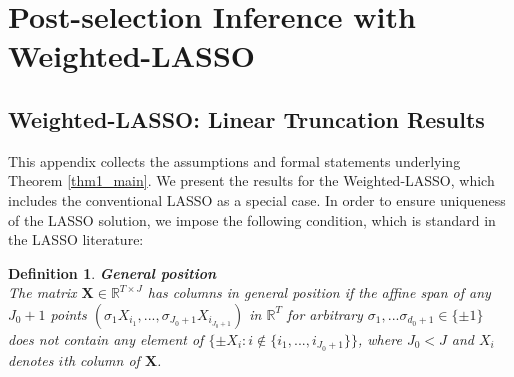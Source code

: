 \documentclass[11pt]{article}
\newcommand{\RR}{\mathbb{R}}
\begin{document}

\appendix


\renewcommand{\thesubsection}{\Alph{section}.\arabic{subsection}}
\setcounter{table}{0}
\setcounter{figure}{0}
\renewcommand{\thetable}{A.\arabic{table}}
\renewcommand{\thefigure}{A.\arabic{figure}}


\newtheorem{thm}{Theorem}[section]
\newtheorem{lem}{Theorem}[section]
\newtheorem{defin}{Theorem}[section]
\newtheorem{ass}{Theorem}[section]


\newtheorem{theorem_app}[thm]{Theorem}
\newtheorem{lemma_app}[lem]{Lemma}
\newtheorem{assumption_app}[ass]{Assumption}
\newtheorem{def_app}[defin]{Definition}



\section{Post-selection Inference with Weighted-LASSO}\label{lab:appendix}

\subsection{Weighted-LASSO: Linear Truncation Results}\label{lab:appendixA1}

This appendix collects the assumptions and formal statements underlying Theorem \ref{thm1_main}. We present the results for the Weighted-LASSO, which includes the conventional LASSO as a special case. In order to ensure uniqueness of the LASSO solution, we impose the following condition, which is standard in the LASSO literature:

\begin{def_app}{\bf General position}\label{def1}\\
	The matrix $\bm{X} \in\RR^{T\times J}$ has columns in general position if the affine span of any $J_0+1$ points $(\sigma_1X_{i_1},...,\sigma_{J_0+1}X_{i_{J_0+1}})$ in $\RR^T$ for arbitrary $\sigma_1,...\sigma_{d_0+1}\in\{\pm1\}$ does not contain any element of $\{\pm X_i:i\notin\{ i_1,...,i_{J_0+1}\} \}$, where $J_0<J$%
    and $X_i$ denotes $i$th column of $\bm{X}$.
\end{def_app}
\end{document}
